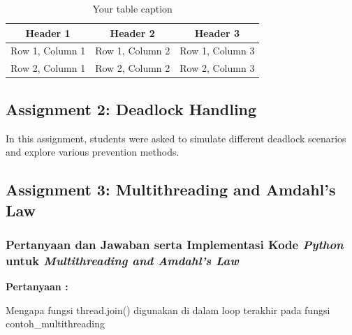 \documentclass[12pt]{article}
\begin{document}
\begin{table}[htbp] %
    \centering
    \begin{tabular}{|c|c|c|} %
    \hline
    Header 1 & Header 2 & Header 3 \\ %
    \hline
    Row 1, Column 1 & Row 1, Column 2 & Row 1, Column 3 \\ %
    \hline
    Row 2, Column 1 & Row 2, Column 2 & Row 2, Column 3 \\ %
    \hline
    \end{tabular}
    \caption{Your table caption} %
    \label{tab:your_label} %
\end{table}
\subsection{Assignment 2: Deadlock Handling}
In this assignment, students were asked to simulate different deadlock scenarios and explore various prevention methods.


\subsection{Assignment 3: Multithreading and Amdahl's Law}
\subsubsection{Pertanyaan dan Jawaban serta Implementasi Kode \textit{Python} untuk \textit{Multithreading and Amdahl’s Law}}

\textbf{Pertanyaan :} 

\vspace{0.2cm}

Mengapa fungsi thread.join() digunakan di dalam loop terakhir pada fungsi {contoh\_multithreading}
\end{document}
